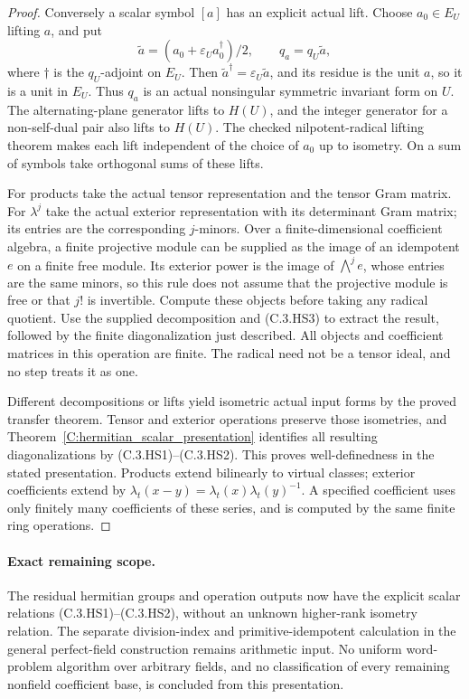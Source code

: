 \begin{proof}
Conversely a scalar symbol $[a]$ has an explicit actual lift.
Choose $a_0\in E_U$ lifting $a$, and put
\[
 \widetilde a=(a_0+\varepsilon_U a_0^\dagger)/2,
 \qquad q_a=q_U\widetilde a,                             \tag{C.3.HS4}
\]
where $\dagger$ is the $q_U$-adjoint on $E_U$.
Then $\widetilde a^\dagger=\varepsilon_U\widetilde a$,
and its residue is the unit $a$, so it is a unit in $E_U$.
Thus $q_a$ is an actual nonsingular symmetric invariant form on
$U$. The alternating-plane generator lifts to $H(U)$, and the
integer generator for a non-self-dual pair also lifts to $H(U)$.
The checked nilpotent-radical lifting theorem makes each lift
independent of the choice of $a_0$ up to isometry. On a sum of
symbols take orthogonal sums of these lifts.

For products take the actual tensor representation and the tensor
Gram matrix. For $\lambda^j$ take the actual exterior representation
with its determinant Gram matrix; its entries are the corresponding
$j$-minors. Over a finite-dimensional coefficient algebra, a finite
projective module can be supplied as the image of an idempotent
$e$ on a finite free module. Its exterior power is the image of
$\bigwedge^j e$, whose entries are the same minors, so this rule
does not assume that the projective module is free or that $j!$
is invertible. Compute these objects before taking any radical
quotient. Use the supplied decomposition and (C.3.HS3) to extract
the result, followed by the finite diagonalization just described.
All objects and coefficient matrices in this operation are finite.
The radical need not be a tensor ideal, and no step treats it as one.

Different decompositions or lifts yield isometric actual input
forms by the proved transfer theorem. Tensor and exterior operations
preserve those isometries, and Theorem~\ref{C:hermitian_scalar_presentation}
identifies all resulting diagonalizations by (C.3.HS1)--(C.3.HS2).
This proves well-definedness in the stated presentation.
Products extend bilinearly to virtual classes; exterior coefficients
extend by $\lambda_t(x-y)=\lambda_t(x)\lambda_t(y)^{-1}$.
A specified coefficient uses only finitely many coefficients of
these series, and is computed by the same finite ring operations.
\end{proof}

\paragraph{Exact remaining scope.}
The residual hermitian groups and operation outputs now have the
explicit scalar relations (C.3.HS1)--(C.3.HS2), without an unknown
higher-rank isometry relation. The separate division-index and
primitive-idempotent calculation in the general perfect-field
construction remains arithmetic input. No uniform word-problem
algorithm over arbitrary fields, and no classification of every
remaining nonfield coefficient base, is concluded from this presentation.
